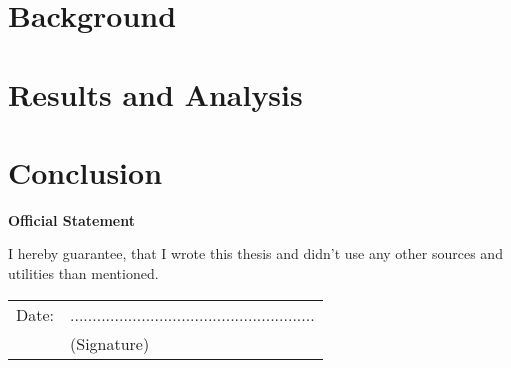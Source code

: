\documentclass[12pt,a4paper,bibliography=totocnumbered,listof=totocnumbered]{scrartcl}
\begin{document}




\pagebreak

\section{Background}

\pagebreak



\section{Results and Analysis}


\section{Conclusion}




\renewcommand\refname{Quellenverzeichnis}


\pagebreak





\newpage
\thispagestyle{empty}
\begin{center}
	\vspace*{5em}
	\huge\textbf{Official Statement}\\
\end{center}
\vspace{2em}

I hereby guarantee, that I wrote this thesis and didn't use any other sources and utilities than mentioned.

\vspace{4em}
\begin{minipage}{\linewidth}
	\begin{tabular}{p{15em}p{15em}}
		Date: &  .......................................................\\
		& \centering (Signature)\\
	\end{tabular}
\end{minipage}
\end{document}
